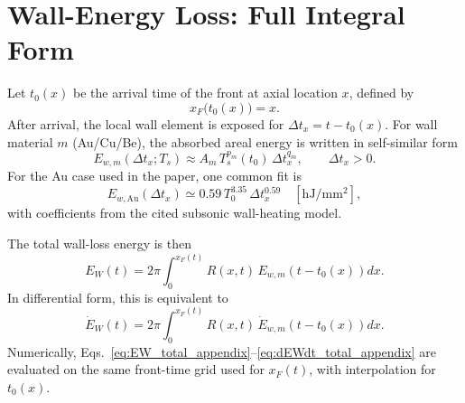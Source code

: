 \documentclass[11pt]{article}
\begin{document}
\section{Wall-Energy Loss: Full Integral Form}
Let $t_0(x)$ be the arrival time of the front at axial location $x$, defined by
\begin{equation}
x_F\bigl(t_0(x)\bigr)=x.
\end{equation}
After arrival, the local wall element is exposed for $\Delta t_x=t-t_0(x)$. For wall material $m$ (Au/Cu/Be), the absorbed areal energy is written in self-similar form
\begin{equation}
E_{w,m}(\Delta t_x;T_s)\approx A_m\,T_s^{p_m}(t_0)\,\Delta t_x^{q_m},
\qquad \Delta t_x>0.
\label{eq:wall_areal_generic_appendix}
\end{equation}
For the Au case used in the paper, one common fit is
\begin{equation}
E_{w,\mathrm{Au}}(\Delta t_x)\simeq0.59\,T_0^{3.35}\,\Delta t_x^{0.59}
\quad [\mathrm{hJ/mm^2}],
\label{eq:wall_Au_fit_appendix}
\end{equation}
with coefficients from the cited subsonic wall-heating model.

The total wall-loss energy is then
\begin{equation}
E_W(t)=2\pi\int_0^{x_F(t)}R(x,t)\,E_{w,m}\!\left(t-t_0(x)\right)dx.
\label{eq:EW_total_appendix}
\end{equation}
In differential form, this is equivalent to
\begin{equation}
\dot E_W(t)=2\pi\int_0^{x_F(t)}R(x,t)\,\dot E_{w,m}\!\left(t-t_0(x)\right)dx.
\label{eq:dEWdt_total_appendix}
\end{equation}
Numerically, Eqs.~\eqref{eq:EW_total_appendix}--\eqref{eq:dEWdt_total_appendix} are evaluated on the same front-time grid used for $x_F(t)$, with interpolation for $t_0(x)$.
\end{document}
